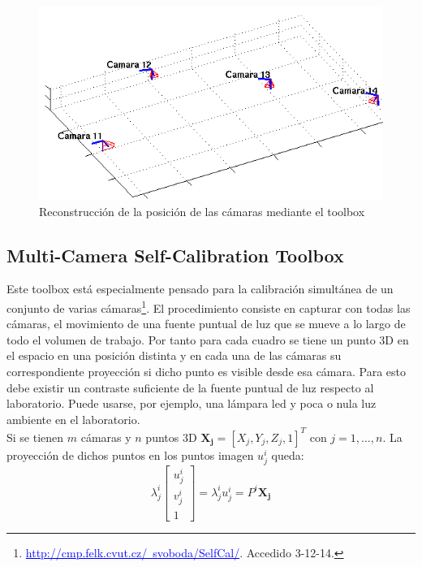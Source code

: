\begin{figure}[ht!]
\begin{center}
\includegraphics[scale=0.7]{img/calibracion/tablero_cam_relevadas_4c.png}
\end{center}
\caption{Reconstrucción de la posición de las cámaras mediante el toolbox}
\label{fig: tablero_posicion_camaras}
\end{figure}


 \subsection{ Multi-Camera Self-Calibration Toolbox} 
 
 Este toolbox está especialmente pensado para la calibración simultánea de un conjunto de varias cámaras\footnote{\textcolor{blue}{\underline{http://cmp.felk.cvut.cz/~svoboda/SelfCal/}}. Accedido 3-12-14.}. El procedimiento consiste en capturar con todas las cámaras, el movimiento de una fuente puntual de luz que se mueve a lo largo de todo el volumen de trabajo. Por tanto para cada cuadro se tiene un punto 3D en el espacio en una posición distinta y en cada una de las cámaras su correspondiente proyección si dicho punto es visible desde esa cámara. Para esto debe existir un contraste suficiente de la fuente puntual de luz respecto al laboratorio. Puede usarse, por ejemplo, una lámpara led y poca o nula luz ambiente en el laboratorio.\\
 
 
 Si se tienen $m$ cámaras y $n$ puntos 3D  
$\mathbf{X_j} = [X_j, Y_j, Z_j,1]^T$ con $j=1,\ldots,n$. La proyección de dichos puntos en los puntos imagen $u_j^i$ queda:
\[ \lambda_j^i
\begin{bmatrix}
u_j^i \\
v_j^i \\
1
\end{bmatrix} 
 = \lambda_j^i u_j^i = P^i \mathbf{X_j}
\]


